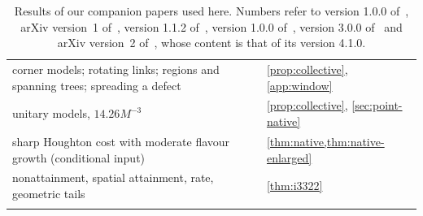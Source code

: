 {\begin{longtable}{@{}L{0.45\textwidth}L{0.21\textwidth}L{0.26\textwidth}@{}}
corner models; rotating links; regions and spanning trees; spreading a defect & \cite[Prop.~6.1, Lemmas~6.3, 6.4, proof of Prop.~6.5]{DM-H3} & \cref{prop:collective}, \cref{app:window}\\
unitary models, $14.26M^{-3}$ & \cite[Prop.~6.5]{DM-H3} & \cref{prop:collective}, \cref{sec:point-native}\\
\midrule
sharp Houghton cost with moderate flavour growth (conditional input) & \cite[App.~R]{DM-ID} & \cref{thm:native,thm:native-enlarged}\\
\midrule
nonattainment, spatial attainment, rate, geometric tails & \cite[Thms.~1, 2, 6, \S5.2]{Dou26} & \cref{thm:i3322}\\
\bottomrule
\caption{Results of our companion papers used here. Numbers refer to version 1.0.0 of~\cite{DM-game}, arXiv version~1 of~\cite{DM-lamps}, version 1.1.2
of~\cite{DM-H3}, version 1.0.0 of~\cite{DM-ID}, version 3.0.0 of~\cite{DM-U3} and arXiv version~2 of~\cite{Dou26}, whose content is that of its version 4.1.0.}\label{tab:companion}
\end{longtable}}
